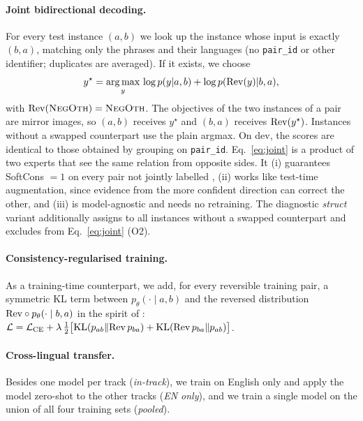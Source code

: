 \paragraph{Joint bidirectional decoding.} For every test instance $(a,b)$ we look up the instance whose input is exactly $(b,a)$, matching only the phrases and their languages (no \texttt{pair\_id} or other identifier; duplicates are averaged). If it exists, we choose
\begin{equation}
y^\star = \operatorname*{arg\,max}_{y}\, \log p(y|a,b) + \log p(\mathrm{Rev}(y)|b,a),
\label{eq:joint}
\end{equation}
with $\mathrm{Rev}(\textsc{NegOth})=\textsc{NegOth}$. The objectives of the two instances of a pair are mirror images, so $(a,b)$ receives $y^\star$ and $(b,a)$ receives $\mathrm{Rev}(y^\star)$. Instances without a swapped counterpart use the plain argmax. On dev, the scores are identical to those obtained by grouping on \texttt{pair\_id}. Eq.~\ref{eq:joint} is a product of two experts that see the same relation from opposite sides. It (i) guarantees SoftCons $=1$ on every pair not jointly labelled \NO, (ii) works like test-time augmentation, since evidence from the more confident direction can correct the other, and (iii) is model-agnostic and needs no retraining. The diagnostic \textit{struct} variant additionally assigns \NO to all instances without a swapped counterpart and excludes \NO from Eq.~\ref{eq:joint} (O2).

\paragraph{Consistency-regularised training.} As a training-time counterpart, we add, for every reversible training pair, a symmetric KL term between $p_\theta(\cdot\mid a,b)$ and the reversed distribution $\mathrm{Rev}\circ p_\theta(\cdot\mid b,a)$ in the spirit of \citet{li2019logic}: $\mathcal{L} = \mathcal{L}_{\text{CE}} + \lambda\,\tfrac{1}{2}\big[\mathrm{KL}(p_{ab}\Vert \mathrm{Rev}\,p_{ba}) + \mathrm{KL}(\mathrm{Rev}\,p_{ba}\Vert p_{ab})\big]$.

\paragraph{Cross-lingual transfer.} Besides one model per track (\emph{in-track}), we train on English only and apply the model zero-shot to the other tracks (\emph{EN only}), and we train a single model on the union of all four training sets (\emph{pooled}).



